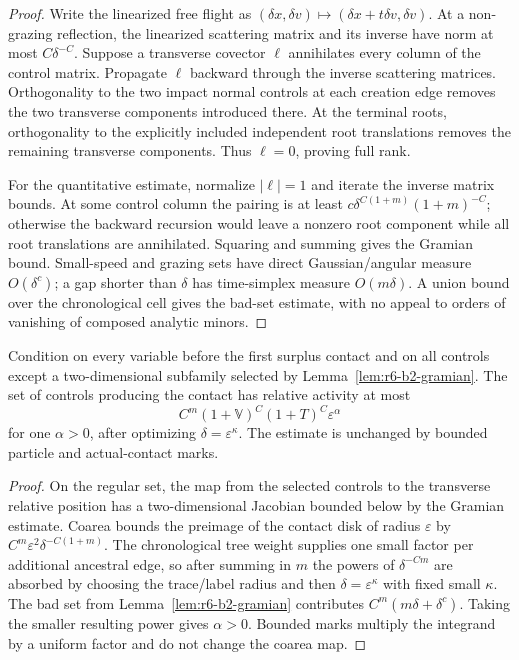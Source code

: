 \begin{proof}
Write the linearized free flight as
\((\delta x,\delta v)\mapsto(\delta x+t\delta v,\delta v)\).  At a
non-grazing reflection, the linearized scattering matrix and its inverse have
norm at most \(C\delta^{-C}\).  Suppose a transverse covector \(\ell\)
annihilates every column of the control matrix.  Propagate \(\ell\) backward
through the inverse scattering matrices.  Orthogonality to the two impact
normal controls at each creation edge removes the two transverse components
introduced there.  At the terminal roots, orthogonality to the explicitly
included independent root translations removes the remaining transverse
components.  Thus \(\ell=0\), proving full rank.

For the quantitative estimate, normalize \(|\ell|=1\) and iterate the inverse
matrix bounds.  At some control column the pairing is at least
\(c\delta^{C(1+m)}(1+m)^{-C}\); otherwise the backward recursion would leave a
nonzero root component while all root translations are annihilated.  Squaring
and summing gives the Gramian bound.  Small-speed and grazing sets have direct
Gaussian/angular measure \(O(\delta^c)\); a gap shorter than \(\delta\) has
time-simplex measure \(O(m\delta)\).  A union bound over the chronological
cell gives the bad-set estimate, with no appeal to orders of vanishing of
composed analytic minors.
\end{proof}

\begin{lemma}
\label{lem:r6-b2-tube}
Condition on every variable before the first surplus contact and on all
controls except a two-dimensional subfamily selected by
Lemma~\ref{lem:r6-b2-gramian}.  The set of controls producing the contact has
relative activity at most
\[
C^m(1+\mathbb V)^C(1+T)^C\varepsilon^\alpha
\]
for one \(\alpha>0\), after optimizing \(\delta=\varepsilon^\kappa\).
The estimate is unchanged by bounded particle and actual-contact marks.
\end{lemma}

\begin{proof}
On the regular set, the map from the selected controls to the transverse
relative position has a two-dimensional Jacobian bounded below by the Gramian
estimate.  Coarea bounds the preimage of the contact disk of radius
\(\varepsilon\) by
\(C^m\varepsilon^2\delta^{-C(1+m)}\).  The chronological tree weight supplies
one small factor per additional ancestral edge, so after summing in \(m\) the
powers of \(\delta^{-Cm}\) are absorbed by choosing the trace/label radius and
then \(\delta=\varepsilon^\kappa\) with fixed small \(\kappa\).  The bad set
from Lemma~\ref{lem:r6-b2-gramian} contributes
\(C^m(m\delta+\delta^c)\).  Taking the smaller resulting power gives
\(\alpha>0\).  Bounded marks multiply the integrand by a uniform factor and
do not change the coarea map.
\end{proof}

